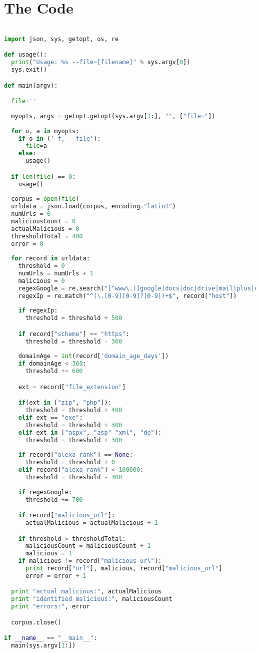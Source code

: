 \documentclass[letterpaper, onecolumn,10pt]{IEEEtran}
\begin{document}
		\section{The Code}
		\begin{lstlisting}[language=Python]

import json, sys, getopt, os, re

def usage():
  print("Usage: %s --file=[filename]" % sys.argv[0])
  sys.exit()

def main(argv):

  file=''
 
  myopts, args = getopt.getopt(sys.argv[1:], "", ["file="])
 
  for o, a in myopts:
    if o in ('-f, --file'):
      file=a
    else:
      usage()

  if len(file) == 0:
    usage()
 
  corpus = open(file)
  urldata = json.load(corpus, encoding="latin1")
  numUrls = 0
  maliciousCount = 0
  actualMalicious = 0
  thresholdTotal = 400
  error = 0
  
  for record in urldata:
    threshold = 0
    numUrls = numUrls + 1
    malicious = 0
    regexGoogle = re.search("[^www\.)]google(docs|doc|drive|mail|plus|calendar)*", record["url"]) #Does this look like a google address?
    regexIp = re.match("^(\.[0-9][0-9]?[0-9])+$", record["host"])
    
    if regexIp:
      threshold = threshold + 500

    if record["scheme"] == "https":
      threshold = threshold - 300
    
    domainAge = int(record['domain_age_days'])
    if domainAge < 360:
      threshold += 600

    ext = record["file_extension"]

    if(ext in ["zip", "php"]):
      threshold = threshold + 400
    elif ext == "exe":
      threshold = threshold + 300
    elif ext in ["aspx", "asp" "xml", "de"]:
      threshold = threshold + 300
    
    if record["alexa_rank"] == None:
      threshold = threshold + 0
    elif record["alexa_rank"] < 100000:
      threshold = threshold - 300
          
    if regexGoogle:
      threshold += 700

    if record["malicious_url"]:
      actualMalicious = actualMalicious + 1

    if threshold > thresholdTotal:
      maliciousCount = maliciousCount + 1
      malicious = 1
    if malicious != record["malicious_url"]:
      print record["url"], malicious, record["malicious_url"]
      error = error + 1

  print "actual malicious:", actualMalicious
  print "identified malicious:", maliciousCount
  print "errors:", error

  corpus.close()

if __name__ == "__main__":
  main(sys.argv[1:])

		\end{lstlisting}
		
\end{document}
